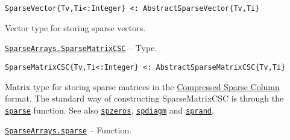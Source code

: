 \begin{adjustwidth}{2em}{0pt}


\begin{verbatim}
SparseVector{Tv,Ti<:Integer} <: AbstractSparseVector{Tv,Ti}
\end{verbatim}

Vector type for storing sparse vectors.



\end{adjustwidth}
\hypertarget{15099699527958384292}{} 
\hyperlink{15099699527958384292}{\texttt{SparseArrays.SparseMatrixCSC}}  -- {Type.}

\begin{adjustwidth}{2em}{0pt}


\begin{verbatim}
SparseMatrixCSC{Tv,Ti<:Integer} <: AbstractSparseMatrixCSC{Tv,Ti}
\end{verbatim}

Matrix type for storing sparse matrices in the \hyperlink{4286524230912717228}{Compressed Sparse Column} format. The standard way of constructing SparseMatrixCSC is through the \hyperlink{10167157011990389788}{\texttt{sparse}} function. See also \hyperlink{10306793690101482847}{\texttt{spzeros}}, \hyperlink{10407455986460913397}{\texttt{spdiagm}} and \hyperlink{10437881912081266792}{\texttt{sprand}}.



\end{adjustwidth}
\hypertarget{10167157011990389788}{} 
\hyperlink{10167157011990389788}{\texttt{SparseArrays.sparse}}  -- {Function.}

